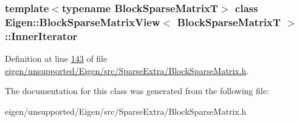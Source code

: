\subsubsection*{template$<$typename Block\+Sparse\+MatrixT$>$\newline
class Eigen\+::\+Block\+Sparse\+Matrix\+View$<$ Block\+Sparse\+Matrix\+T $>$\+::\+Inner\+Iterator}



Definition at line \hyperlink{eigen_2unsupported_2_eigen_2src_2_sparse_extra_2_block_sparse_matrix_8h_source_l00143}{143} of file \hyperlink{eigen_2unsupported_2_eigen_2src_2_sparse_extra_2_block_sparse_matrix_8h_source}{eigen/unsupported/\+Eigen/src/\+Sparse\+Extra/\+Block\+Sparse\+Matrix.\+h}.



The documentation for this class was generated from the following file\+:\begin{DoxyCompactItemize}
\item 
eigen/unsupported/\+Eigen/src/\+Sparse\+Extra/\+Block\+Sparse\+Matrix.\+h\end{DoxyCompactItemize}
